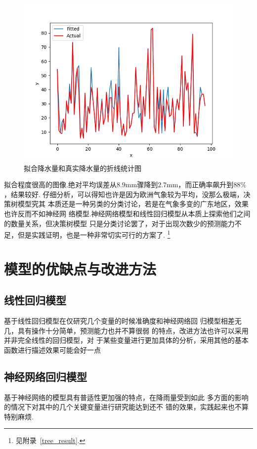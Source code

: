 \documentclass[UTF8, a4paper]{ctexart}
\begin{document}
\begin{figure}[h!]
	\centering
	\includegraphics[scale=0.3]{very_success.png}
	\caption{拟合降水量和真实降水量的折线统计图}\label{pic10}
\end{figure}

拟合程度很高的图像.绝对平均误差从$8.9$\si{\milli\meter}骤降到$2.7$\si{\milli\meter}，而正确率飙升到$88\%$，结果较好.
仔细分析，可以得知也许是因为欧洲气象较为平均，没那么极端，决策树模型究其
本质还是一种另类的分类讨论，若是在气象多变的广东地区，效果也许反而不如神经网
络模型.神经网络模型和线性回归模型从本质上探索他们之间的数量关系，但决策树模型
只是分类讨论罢了，对于出现次数少的预测能力不足，但是实践证明，也是一种非常切实可行的方案了.
\footnote{见附录~\textcolor{red}{\ref{tree_result}}.}


\section{模型的优缺点与改进方法}

\subsection{线性回归模型}
基于线性回归模型在仅研究几个变量的时候准确度和神经网络回
归模型相差无几，具有操作十分简单，预测能力也并不算很弱
的特点，改进方法也许可以采用并非完全线性的回归模型，对
于某些变量进行更加具体的分析，采用其他的基本函数进行描述效果可能会好一点

\subsection{神经网络回归模型}
基于神经网络的模型具有普适性更加强的特点，在降雨量受到如此
多方面的影响的情况下对其中的几个关键变量进行研究能达到还不
错的效果，实践起来也不算特别麻烦.
\end{document}
